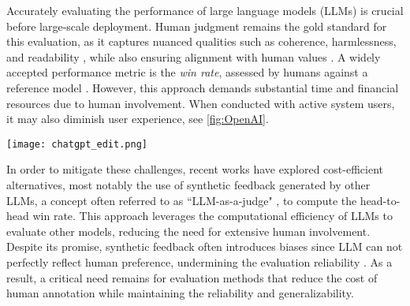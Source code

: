 \begin{figure*}[ht]
    \centering
    \hfill
    \caption{(Left) Illustration of Control Variates Evaluation, which makes use of a possibly inaccurate synthetic evaluator to reduce the variance of evaluation, reducing the need of human annotations while preserving unbiasedness.  (Right) Averaged mean square error v.s. number of human annotations for Human Evaluation, Synthetic Evaluation and Control Variates Evaluation using the finetuned Skywork-8B evaluator on Chatbot Arena. The Synthetic Evaluation has high bias, while the bias of Human and Control Variates Evaluations are negligible. Control Variates Evaluation reduces the variance of Human Evaluation. \loose}
    \label{fig:main}
\end{figure*}

Accurately evaluating the performance of large language models (LLMs) is crucial before large-scale deployment. Human judgment remains the gold standard for this evaluation, as it captures nuanced qualities such as coherence, harmlessness, and readability \citep{bai2022training}, while also ensuring alignment with human values \citep{ouyang2022training}. A widely accepted performance metric is the \emph{win rate}, assessed by humans against a reference model \citep{chiang2024chatbot}. However, this approach demands substantial time and financial resources due to human involvement. When conducted with active system users, it may also diminish user experience, see \cref{fig:OpenAI}.

\begin{figure*}[tbhp]
    \centering
    \texttt{[image: chatgpt\_edit.png]}
    \caption{OpenAI's prompting users for feedback; excessive requests may negatively impact user experience.}
    \label{fig:OpenAI}
\end{figure*}

In order to mitigate these challenges, recent works have explored cost-efficient alternatives, most notably the use of synthetic feedback generated by other LLMs, a concept often referred to as ``LLM-as-a-judge" \citep{zheng2023judging,dubois2024length}, to compute the head-to-head win rate. This approach leverages the computational efficiency of LLMs to evaluate other models, reducing the need for extensive human involvement.  Despite its promise, synthetic feedback often introduces biases since LLM can not perfectly reflect human preference, undermining the evaluation reliability \citep{zheng2024cheating}. As a result, a critical need remains for evaluation methods that reduce the cost of human annotation while maintaining the reliability and generalizability. \loose

